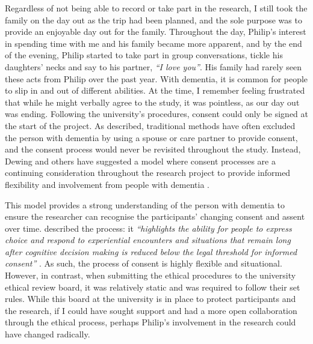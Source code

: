 Regardless of not being able to record or take part in the research, I still took the family on the day out as the trip had been planned, and the sole purpose was to provide an enjoyable day out for the family. Throughout the day, Philip's interest in spending time with me and his family became more apparent, and by the end of the evening, Philip started to take part in group conversations, tickle his daughters' necks and say to his partner, \textit{``I love you''}. His family had rarely seen these acts from Philip over the past year. With dementia, it is common for people to slip in and out of different abilities. At the time, I remember feeling frustrated that while he might verbally agree to the study, it was pointless, as our day out was ending. Following the university's procedures, consent could only be signed at the start of the project. As \cite{dewing_participatory_2007} described, traditional methods have often excluded the person with dementia by using a spouse or care partner to provide consent, and the consent process would never be revisited throughout the study. Instead, Dewing and others have suggested a model where consent processes are a continuing consideration throughout the research project to provide informed flexibility and involvement from people with dementia \citep{dewing_participatory_2007,slaughter2007consent,mckeown_actively_2009}.

This model provides a strong understanding of the person with dementia to ensure the researcher can recognise the participants' changing consent and assent over time. \cite{haraldsdottir2019relational} described the process: it \textit{``highlights the ability for people to express choice and respond to experiential encounters and situations that remain long after cognitive decision making is reduced below the legal threshold for informed consent''} \citep[p. 4]{haraldsdottir2019relational}. As such, the process of consent is highly flexible and situational. However, in contrast, when submitting the ethical procedures to the university ethical review board, it was relatively static and was required to follow their set rules. While this board at the university is in place to protect participants and the research, if I could have sought support and had a more open collaboration through the ethical process, perhaps Philip's involvement in the research could have changed radically.


